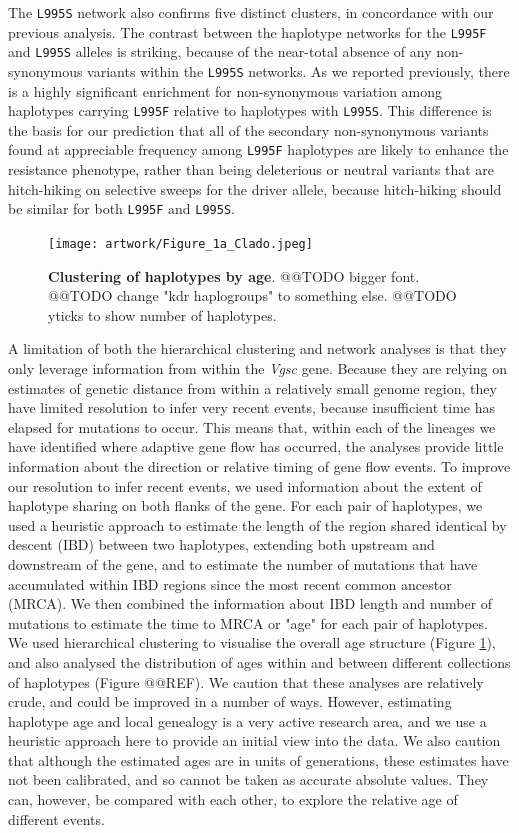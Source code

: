 \documentclass[a4paper,11pt,abstracton]{scrartcl}
\begin{document}
The \texttt{L995S} network also confirms five distinct clusters, in concordance with our previous analysis.
%
The contrast between the haplotype networks for the \texttt{L995F} and \texttt{L995S} alleles is striking, because of the near-total absence of any non-synonymous variants within the \texttt{L995S} networks.
%
As we reported previously, there is a highly significant enrichment for non-synonymous variation among haplotypes carrying \texttt{L995F} relative to haplotypes with \texttt{L995S}.
%
This difference is the basis for our prediction that all of the secondary non-synonymous variants found at appreciable frequency among \texttt{L995F} haplotypes are likely to enhance the resistance phenotype, rather than being deleterious or neutral variants that are hitch-hiking on selective sweeps for the driver allele, because hitch-hiking should be similar for both \texttt{L995F} and \texttt{L995S}.


\begin{figure}[!b]
  \texttt{[image: artwork/Figure\_1a\_Clado.jpeg]}
  \caption{\textbf{Clustering of haplotypes by age}. @@TODO bigger font. @@TODO change "kdr haplogroups" to something else. @@TODO yticks to show number of haplotypes.}
  \label{fig:tree}
\end{figure}


%
A limitation of both the hierarchical clustering and network analyses is that they only leverage information from within the \textit{Vgsc} gene. 
%
Because they are relying on estimates of genetic distance from within a relatively small genome region, they have limited resolution to infer very recent events, because insufficient time has elapsed for mutations to occur.
%
This means that, within each of the lineages we have identified where adaptive gene flow has occurred, the analyses provide little information about the direction or relative timing of gene flow events.
%
To improve our resolution to infer recent events, we used information about the extent of haplotype sharing on both flanks of the gene.
%
For each pair of haplotypes, we used a heuristic approach to estimate the length of the region shared identical by descent (IBD) between two haplotypes, extending both upstream and downstream of the gene, and to estimate the number of mutations that have accumulated within IBD regions since the most recent common ancestor (MRCA).
%
We then combined the information about IBD length and number of mutations to estimate the time to MRCA or "age" for each pair of haplotypes.
%
We used hierarchical clustering to visualise the overall age structure (Figure \ref{fig:tree}), and also analysed the distribution of ages within and between different collections of haplotypes (Figure @@REF).
%
We caution that these analyses are relatively crude, and could be improved in a number of ways. 
%
However, estimating haplotype age and local genealogy is a very active research area, and we use a heuristic approach here to provide an initial view into the data.
%
We also caution that although the estimated ages are in units of generations, these estimates have not been calibrated, and so cannot be taken as accurate absolute values.
%
They can, however, be compared with each other, to explore the relative age of different events.
%
\end{document}
